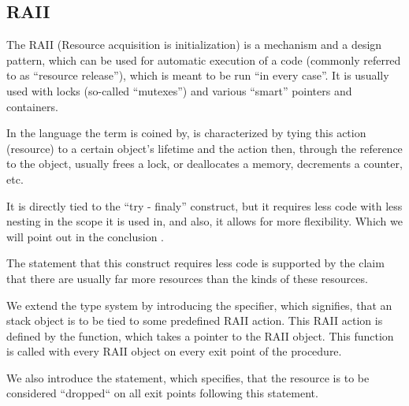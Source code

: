 

\subsection{RAII}

\label{RAII}


The RAII (Resource acquisition is initialization) is a mechanism and a design pattern, which can be used for automatic execution of a code (commonly referred to as ``resource release''), which is meant to be run ``in every case''. It is usually used with locks (so-called ``mutexes'') and various ``smart'' pointers and containers.

In the language the term is coined by, is characterized by tying this action (resource) to a certain object's lifetime and the action then, through the reference to the object, usually frees a lock, or deallocates a memory, decrements a counter, etc.

It is directly tied to the ``try - finaly''  construct, but it requires less code with less nesting in the scope it is used in, and also, it allows for more flexibility. Which we will point out in the conclusion .

The statement that this construct requires less code is supported by the claim that there are usually far more resources than the kinds of these resources.

We extend the type system by introducing the  specifier, which signifies, that an stack object is to be tied to some predefined RAII action. This RAII action is defined by the  function, which takes a pointer to the RAII object. This function is called with every RAII object on every exit point of the procedure.

We also introduce the  statement, which specifies, that the resource is to be considered ``dropped`` on all exit points following this statement.

